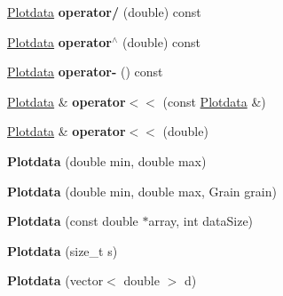 \begin{DoxyCompactItemize}
\item 
\hyperlink{class_plotdata}{Plotdata} {\bfseries operator/} (double) const \hypertarget{class_plotdata_a930afc5f93b85284ef8e5130f9702264}{}\label{class_plotdata_a930afc5f93b85284ef8e5130f9702264}

\item 
\hyperlink{class_plotdata}{Plotdata} {\bfseries operator$^\wedge$} (double) const \hypertarget{class_plotdata_afe66bce831ee3d3f0a32295bf255155c}{}\label{class_plotdata_afe66bce831ee3d3f0a32295bf255155c}

\item 
\hyperlink{class_plotdata}{Plotdata} {\bfseries operator-\/} () const \hypertarget{class_plotdata_a4ea79e07e79b27142c602def0e6b6932}{}\label{class_plotdata_a4ea79e07e79b27142c602def0e6b6932}

\item 
\hyperlink{class_plotdata}{Plotdata} \& {\bfseries operator$<$$<$} (const \hyperlink{class_plotdata}{Plotdata} \&)\hypertarget{class_plotdata_affea4371d4813f269ed131c25ef7c184}{}\label{class_plotdata_affea4371d4813f269ed131c25ef7c184}

\item 
\hyperlink{class_plotdata}{Plotdata} \& {\bfseries operator$<$$<$} (double)\hypertarget{class_plotdata_a0c2832f1e55d3689fd5022d1375632f7}{}\label{class_plotdata_a0c2832f1e55d3689fd5022d1375632f7}

\item 
{\bfseries Plotdata} (double min, double max)\hypertarget{class_plotdata_a7c8a609a6ac5c34518df6e535d70821c}{}\label{class_plotdata_a7c8a609a6ac5c34518df6e535d70821c}

\item 
{\bfseries Plotdata} (double min, double max, Grain grain)\hypertarget{class_plotdata_ab90b1427398c23bc5a1c5266984b281d}{}\label{class_plotdata_ab90b1427398c23bc5a1c5266984b281d}

\item 
{\bfseries Plotdata} (const double $\ast$array, int data\+Size)\hypertarget{class_plotdata_af78f5298cada4237e169d2543beca9b9}{}\label{class_plotdata_af78f5298cada4237e169d2543beca9b9}

\item 
{\bfseries Plotdata} (size\+\_\+t s)\hypertarget{class_plotdata_aca7a7d006626262eb3d7045fb65f31f4}{}\label{class_plotdata_aca7a7d006626262eb3d7045fb65f31f4}

\item 
{\bfseries Plotdata} (vector$<$ double $>$ d)\hypertarget{class_plotdata_abda3257342726fc72b4fda6dfed15771}{}\label{class_plotdata_abda3257342726fc72b4fda6dfed15771}


\end{DoxyCompactItemize}
